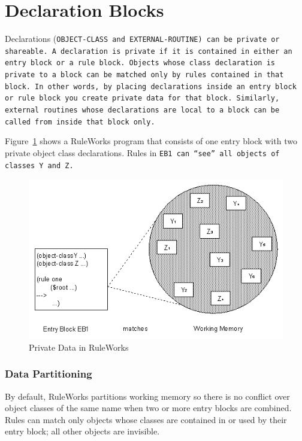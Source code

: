 \section{Declaration Blocks}

Declarations (\tt{OBJECT-CLASS} and \tt{EXTERNAL-ROUTINE}) can be
private or shareable.  A declaration is private if it is contained in
either an entry block or a rule block. Objects whose class declaration
is private to a block can be matched only by rules contained in that
block. In other words, by placing declarations inside an entry block
or rule block you create private data for that block. Similarly,
external routines whose declarations are local to a block can be
called from inside that block only.

Figure~\ref{f:5-3} shows a RuleWorks program that consists of one
entry block with two private object class declarations. Rules in
\tt{EB1} can ``see'' all objects of classes \tt{Y} and \tt{Z}.

\begin{figure}[h]
  \centering
  \includegraphics[scale=0.7]{f5-3}
  \caption{Private Data in RuleWorks}
  \label{f:5-3}
\end{figure}

\subsubsection{Data Partitioning}

By default, RuleWorks partitions working memory so there is no
conflict over object classes of the same name when two or more entry
blocks are combined. Rules can match only objects whose classes are
contained in or used by their entry block; all other objects are
invisible.


